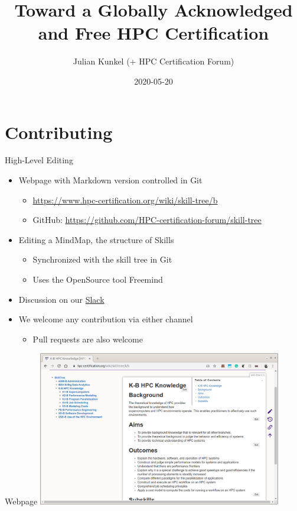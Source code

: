 \documentclass[compress,aspectratio=169]{beamer}
\subtitle{}
\title{\Large Toward a Globally Acknowledged and Free HPC Certification}
\author{Julian Kunkel (+ HPC Certification Forum)}
\date{2020-05-20}
\institute{Department of Computer Science}
\begin{document}
\begin{frame}[plain]{}
	\maketitle
\end{frame}

\section{Contributing}

\begin{frame}{High-Level Editing}
  \begin{itemize}
    \item Webpage with Markdown version controlled in Git
      \begin{itemize}
        \item \url{https://www.hpc-certification.org/wiki/skill-tree/b}
        \item GitHub: \url{https://github.com/HPC-certification-forum/skill-tree}
      \end{itemize}
    \item Editing a MindMap, the structure of Skills
      \begin{itemize}
        \item Synchronized with the skill tree in Git
        \item Uses the OpenSource tool Freemind
      \end{itemize}
    \item Discussion on our \href{https://join.slack.com/t/hpc-certification/shared_invite/enQtMzUwNzU3NzM2MTkzLTAzZWM3NDg0N2I2ZmQwOWI5ZGUwNjNlNDgzM2RmOTM3ZWRjNjIxYTc5NzUxYTJhNmRlNmM5YmE1NDY3YzkzYzA}{Slack}
    \item We welcome any contribution via either channel
      \begin{itemize}
        \item Pull requests are also welcome
      \end{itemize}
  \end{itemize}
\end{frame}

\begin{frame}{Webpage}
  \includegraphics[width=0.8\textwidth]{www}
\end{frame}
\end{document}
